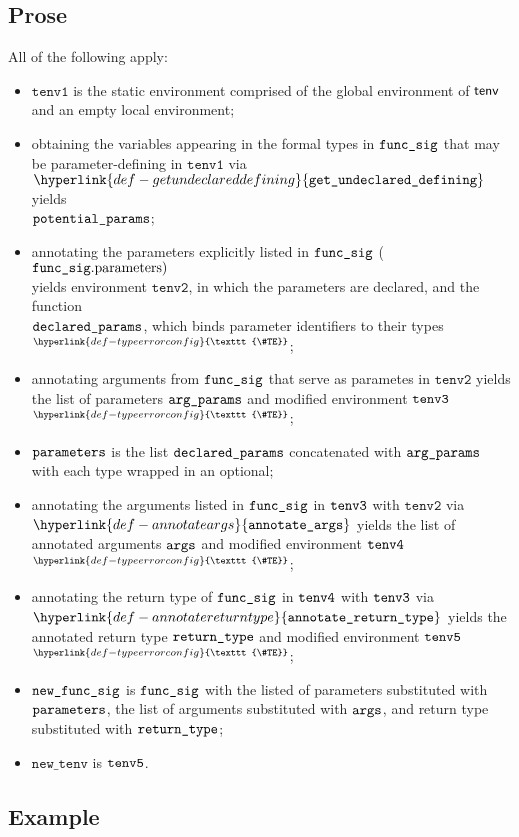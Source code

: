 \documentclass{book}
\newcommand\TypeErrorConfig[0]{\hyperlink{def-typeerrorconfig}{\texttt{\#TE}}}
\newcommand\ProseOrTypeError[0]{\hyperlink{def-proseortypeerror}{$^{\TypeErrorConfig}$}}
\newcommand\annotateargs[0]{\hyperlink{def-annotateargs}{\texttt{annotate\_args}}}
\newcommand\annotatereturntype[0]{\hyperlink{def-annotatereturntype}{\texttt{annotate\_return\_type}}}
\newcommand\getundeclareddefining[0]{\hyperlink{def-getundeclareddefining}{\texttt{get\_undeclared\_defining}}}
\newcommand\newtenv[0]{\texttt{new\_tenv}}
\newcommand\tenvone[0]{\texttt{tenv1}}
\newcommand\tenvtwo[0]{\texttt{tenv2}}
\begin{document}
\subsection{Prose}
All of the following apply:
\begin{itemize}
  \item $\tenvone$ is the static environment comprised of the global environment of $\textsf{tenv}$ and an empty local environment;
  \item obtaining the variables appearing in the formal types in $\texttt{func\_sig}$ that may be parameter-defining
        in $\tenvone$ via $\getundeclareddefining$ yields \\ $\texttt{potential\_params}$;
  \item annotating the parameters explicitly listed in $\texttt{func\_sig}$ ($\texttt{func\_sig}.\text{parameters})$ \\
        yields environment $\tenvtwo$, in which the parameters are declared,
        and the function \\
        $\texttt{declared\_params}$, which binds parameter identifiers to their types \ProseOrTypeError;
  \item annotating arguments from $\texttt{func\_sig}$ that serve as parametes in $\tenvtwo$ yields the list of parameters
        $\texttt{arg\_params}$ and modified environment $\texttt{tenv3}$ \ProseOrTypeError;
  \item $\texttt{parameters}$ is the list $\texttt{declared\_params}$ concatenated with $\texttt{arg\_params}$ with each type
        wrapped in an optional;
  \item annotating the arguments listed in $\texttt{func\_sig}$ in $\texttt{tenv3}$ with $\tenvtwo$ via \\
        $\annotateargs$ yields the list of annotated
        arguments $\texttt{args}$ and modified environment $\texttt{tenv4}$ \ProseOrTypeError;
  \item annotating the return type of $\texttt{func\_sig}$ in $\texttt{tenv4}$ with $\texttt{tenv3}$ via \\ $\annotatereturntype$ yields
        the annotated return type $\texttt{return\_type}$ and modified environment $\texttt{tenv5}$ \ProseOrTypeError;
  \item $\texttt{new\_func\_sig}$ is $\texttt{func\_sig}$ with the listed of parameters substituted with \\ $\texttt{parameters}$,
        the list of arguments substituted with $\texttt{args}$, and return type substituted with $\texttt{return\_type}$;
  \item $\newtenv$ is $\texttt{tenv5}$.
\end{itemize}
\subsection{Example}
\end{document}

